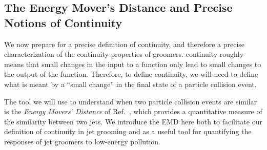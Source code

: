 \subsection{The Energy Mover's Distance and Precise Notions of Continuity}
\label{sec:emd}

We now prepare for a precise definition of continuity, and therefore a precise characterization of the continuity properties of \PIRANHA{} groomers.
%
\Gls{continuity} roughly means that small changes in the input to a function only lead to small changes to the output of the function.
%
Therefore, to define continuity, we will need to define what is meant by a ``small change'' in the final state of a particle collision event.

The tool we will use to understand when two particle collision events are similar is the \textit{Energy Movers' Distance} of Ref.~\cite{Komiske:2019fks}, which provides a quantitative measure of the similarity between two jets.
%
We introduce the EMD here both to facilitate our definition of continuity in jet grooming and as a useful tool for quantifying the responses of jet groomers to low-energy pollution.




